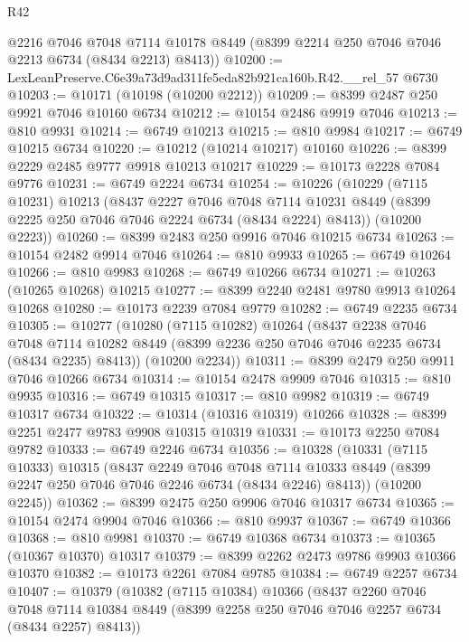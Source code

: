 \begin{lexlean}{R42}
\begin{coremodule}
{      @2216
      @7046
      @7048
      @7114
      @10178
      @8449
      (@8399 @2214 @250 @7046 @7046 @2213 @6734 (@8434 @2213) @8413))
@10200 := LexLeanPreserve.C6e39a73d9ad311fe5eda82b921ca160b.R42.__rel_57 @6730
@10203 := @10171 (@10198 (@10200 @2212))
@10209 := @8399 @2487 @250 @9921 @7046 @10160 @6734
@10212 := @10154 @2486 @9919 @7046
@10213 := @810 @9931
@10214 := @6749 @10213
@10215 := @810 @9984
@10217 := @6749 @10215 @6734
@10220 := @10212 (@10214 @10217) @10160
@10226 := @8399 @2229 @2485 @9777 @9918 @10213 @10217
@10229 := @10173 @2228 @7084 @9776
@10231 := @6749 @2224 @6734
@10254 := @10226
    (@10229
      (@7115 @10231)
      @10213
      (@8437
        @2227
        @7046
        @7048
        @7114
        @10231
        @8449
        (@8399 @2225 @250 @7046 @7046 @2224 @6734 (@8434 @2224) @8413))
      (@10200 @2223))
@10260 := @8399 @2483 @250 @9916 @7046 @10215 @6734
@10263 := @10154 @2482 @9914 @7046
@10264 := @810 @9933
@10265 := @6749 @10264
@10266 := @810 @9983
@10268 := @6749 @10266 @6734
@10271 := @10263 (@10265 @10268) @10215
@10277 := @8399 @2240 @2481 @9780 @9913 @10264 @10268
@10280 := @10173 @2239 @7084 @9779
@10282 := @6749 @2235 @6734
@10305 := @10277
    (@10280
      (@7115 @10282)
      @10264
      (@8437
        @2238
        @7046
        @7048
        @7114
        @10282
        @8449
        (@8399 @2236 @250 @7046 @7046 @2235 @6734 (@8434 @2235) @8413))
      (@10200 @2234))
@10311 := @8399 @2479 @250 @9911 @7046 @10266 @6734
@10314 := @10154 @2478 @9909 @7046
@10315 := @810 @9935
@10316 := @6749 @10315
@10317 := @810 @9982
@10319 := @6749 @10317 @6734
@10322 := @10314 (@10316 @10319) @10266
@10328 := @8399 @2251 @2477 @9783 @9908 @10315 @10319
@10331 := @10173 @2250 @7084 @9782
@10333 := @6749 @2246 @6734
@10356 := @10328
    (@10331
      (@7115 @10333)
      @10315
      (@8437
        @2249
        @7046
        @7048
        @7114
        @10333
        @8449
        (@8399 @2247 @250 @7046 @7046 @2246 @6734 (@8434 @2246) @8413))
      (@10200 @2245))
@10362 := @8399 @2475 @250 @9906 @7046 @10317 @6734
@10365 := @10154 @2474 @9904 @7046
@10366 := @810 @9937
@10367 := @6749 @10366
@10368 := @810 @9981
@10370 := @6749 @10368 @6734
@10373 := @10365 (@10367 @10370) @10317
@10379 := @8399 @2262 @2473 @9786 @9903 @10366 @10370
@10382 := @10173 @2261 @7084 @9785
@10384 := @6749 @2257 @6734
@10407 := @10379
    (@10382
      (@7115 @10384)
      @10366
      (@8437
        @2260
        @7046
        @7048
        @7114
        @10384
        @8449
        (@8399 @2258 @250 @7046 @7046 @2257 @6734 (@8434 @2257) @8413))
}
\end{coremodule}
\end{lexlean}
